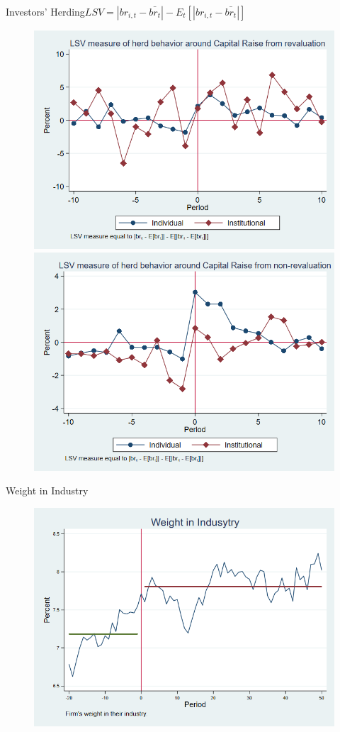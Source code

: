 \documentclass{beamer}
\begin{document}
		\begin{frame}{Investors' Herding}{$LSV =  |br_{i,t} - \bar{br_{t}}| - E_t[|br_{i,t} - \bar{br_{t}}|] $}
		\begin{figure}
			\centering
			\includegraphics[width=0.45\linewidth]{Output/IndInsHerdRevaluation.png}
			\includegraphics[width=0.45\linewidth]{Output/IndInsHerdNoRevaluation.png}
			\label{fig:IndInsHerd_Revaluation}
		\end{figure}
	\end{frame}
	
	
	
	\begin{frame}{Weight in Industry}
		\begin{figure}
			\centering
			\includegraphics[width=0.65\linewidth]{Output/weight}
			\label{fig:weight}
		\end{figure}
	\end{frame}
	
	
	
	
	
	
	
\end{document}
